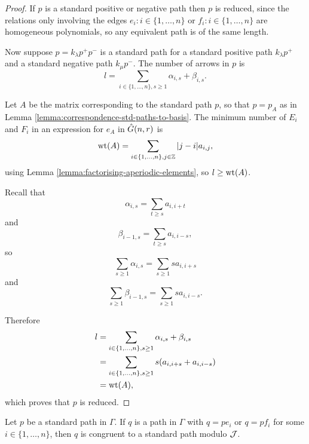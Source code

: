 \documentclass[a4paper, 11pt]{report}
\begin{document}
\begin{proof}
If $p$ is a standard positive or negative path then $p$ is reduced, since the relations only involving the edges $e_i:i\in\{1,\ldots,n\}$ or $f_i:i\in\{1,\ldots,n\}$ are homogeneous polynomials, so any equivalent path is of the same length.

Now suppose $p=k_\lambda p^+p^-$ is a standard path for a standard positive path $k_\lambda p^+$ and a standard negative path $k_\mu p^-$. The number of arrows in $p$ is
\begin{equation*}
l=\sum_{i\in\{1,\ldots,n\},s\geq 1} \alpha_{i,s} + \beta_{i,s}.
\end{equation*}

Let $A$ be the matrix corresponding to the standard path $p$, so that $p=p_A$ as in Lemma \ref{lemma:correspondence-std-paths-to-basis}. The minimum number of $E_i$ and $F_i$ in an expression for $e_A$ in $\hat{G}(n,r)$ is
\begin{equation*}
\operatorname{wt}(A) = \sum_{i\in\{1,\ldots,n\},j\in\mathbb{Z}} |j-i|a_{i,j},
\end{equation*}
using Lemma \ref{lemma:factorising-aperiodic-elements}, so $l\geq \operatorname{wt}(A)$.

Recall that
\begin{equation*}
\alpha_{i,s} = \sum_{t\geq s} a_{i,i+t}
\end{equation*}
and
\begin{equation*}
\beta_{i-1,s} = \sum_{t\geq s} a_{i,i-s},
\end{equation*}
so
\begin{equation*}
\sum_{s\geq 1} \alpha_{i,s} = \sum_{s\geq 1} sa_{i,i+s}
\end{equation*}
and
\begin{equation*}
\sum_{s\geq 1} \beta_{i-1,s} = \sum_{s\geq 1} sa_{i,i-s}.
\end{equation*}

Therefore
\begin{align*}
l &= \sum_{i\in\{1,\ldots,n\},s\geq 1} \alpha_{i,s} + \beta_{i,s}\\
&= \sum_{i\in\{1,\ldots,n\},s\geq 1} s(a_{i,i+s} + a_{i,i-s})\\
&= \operatorname{wt}(A),
\end{align*}
which proves that $p$ is reduced.
\end{proof}

\begin{lemma}\label{lemma:extending-standard-paths}
Let $p$ be a standard path in $\Gamma$. If $q$ is a path in $\Gamma$ with $q=pe_i$ or $q=pf_i$ for some $i\in\{1,\ldots,n\}$, then $q$ is congruent to a standard path modulo $\mathcal{J}$.
\end{lemma}
\end{document}
